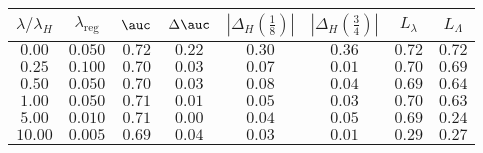\begin{tabular}{cccccccc} 
\toprule 
$\lambda / \lambda_H$ & $\lambda_\text{reg}$ & $\auc$ & $\Delta \auc$ 
& $|\Delta_H(\frac{1}{8})|$ & $|\Delta_H(\frac{3}{4})|$ & $L_\lambda$ & $L_\Lambda$ \\ 
\midrule 
$0.00$ & $0.050$ & $0.72$ & $0.22$ & $0.30$ & $0.36$ & $0.72$ & $0.72$ \\ 
$0.25$ & $0.100$ & $0.70$ & $0.03$ & $0.07$ & $0.01$ & $0.70$ & $0.69$ \\ 
$0.50$ & $0.050$ & $0.70$ & $0.03$ & $0.08$ & $0.04$ & $0.69$ & $0.64$ \\ 
$1.00$ & $0.050$ & $0.71$ & $0.01$ & $0.05$ & $0.03$ & $0.70$ & $0.63$ \\ 
$5.00$ & $0.010$ & $0.71$ & $0.00$ & $0.04$ & $0.05$ & $0.69$ & $0.24$ \\ 
$10.00$ & $0.005$ & $0.69$ & $0.04$ & $0.03$ & $0.01$ & $0.29$ & $0.27$ \\ 
\bottomrule 
\end{tabular} 
